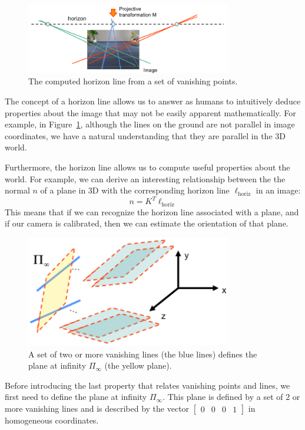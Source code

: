 \documentclass[a4paper, 12pt]{article}
\begin{document}
\begin{figure}[h!]
\centering
\includegraphics[width=0.8\textwidth]{figures/horizon.png}
\caption{The computed horizon line from a set of vanishing points.}
\label{fig:horizon}
\end{figure}

The concept of a horizon line allows us to answer as humans to intuitively deduce properties about the image that may not be easily apparent mathematically. For example, in Figure~\ref{fig:horizon}, although the lines on the ground are not parallel in image coordinates, we have a natural understanding that they are parallel in the 3D world.

Furthermore, the horizon line allows us to compute useful properties about the world. For example, we can derive an interesting relationship between the the normal $n$ of a plane in 3D with the corresponding horizon line $\ell_{\mathrm{horiz}}$ in an image:
\begin{equation}
n = K^T \ell_{\mathrm{horiz}}
\end{equation}
This means that if we can recognize the horizon line associated with a plane, and if our camera is calibrated, then we can estimate the orientation of that plane.
\begin{figure}[h!]
\centering
\includegraphics[width=0.8\textwidth]{figures/plane_infinity.png}
\caption{A set of two or more vanishing lines (the blue lines) defines the plane at infinity $\Pi_\infty$ (the yellow plane).}
\label{fig:plane_infinity}
\end{figure}
Before introducing the last property that relates vanishing points and lines, we first need to define the plane at infinity $\Pi_\infty$. This plane is defined by a set of 2 or more vanishing lines and is described by the vector $\begin{bmatrix} 0 & 0 & 0 &1\end{bmatrix}$ in homogeneous coordinates. 
\end{document}
